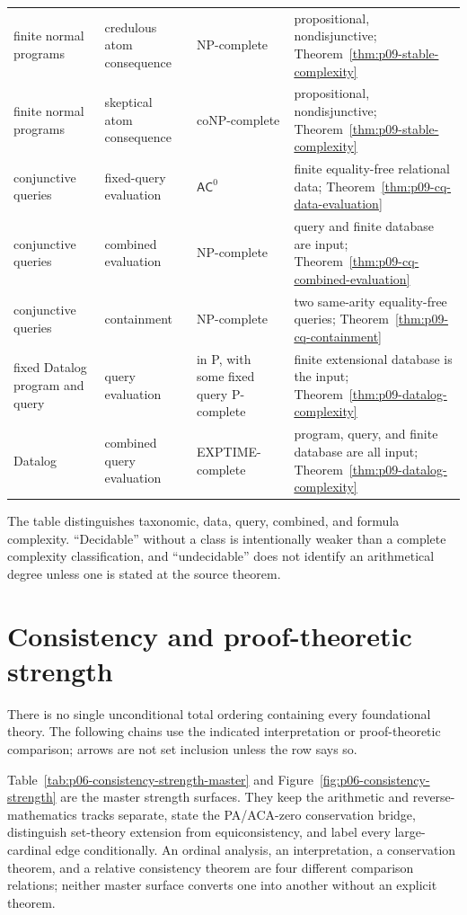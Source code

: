 \begin{longtable}{@{}p{}p{}p{}p{}@{}}
finite normal programs & credulous atom consequence & NP-complete &
propositional, nondisjunctive; Theorem~\ref{thm:p09-stable-complexity} \\
finite normal programs & skeptical atom consequence & coNP-complete &
propositional, nondisjunctive; Theorem~\ref{thm:p09-stable-complexity} \\
conjunctive queries & fixed-query evaluation & \(\mathsf{AC}^{0}\) & finite
equality-free relational data; Theorem~\ref{thm:p09-cq-data-evaluation} \\
conjunctive queries & combined evaluation & NP-complete & query and finite
database are input; Theorem~\ref{thm:p09-cq-combined-evaluation} \\
conjunctive queries & containment & NP-complete & two same-arity equality-free
queries; Theorem~\ref{thm:p09-cq-containment} \\
fixed Datalog program and query & query evaluation & in P, with some fixed
query P-complete & finite extensional database is the input;
Theorem~\ref{thm:p09-datalog-complexity} \\
Datalog & combined query evaluation & EXPTIME-complete & program, query, and
finite database are all input; Theorem~\ref{thm:p09-datalog-complexity} \\
\bottomrule
\end{longtable}

The table distinguishes taxonomic, data, query, combined, and formula
complexity. ``Decidable''
without a class is intentionally weaker than a complete complexity
classification, and ``undecidable'' does not identify an arithmetical degree
unless one is stated at the source theorem.

\section{Consistency and proof-theoretic strength}
\label{sec:p14-strength-table}

There is no single unconditional total ordering containing every foundational
theory. The following chains use the indicated interpretation or proof-theoretic
comparison; arrows are not set inclusion unless the row says so.

Table~\ref{tab:p06-consistency-strength-master} and
Figure~\ref{fig:p06-consistency-strength} are the master strength surfaces.
They keep the arithmetic and reverse-mathematics tracks separate, state the
PA/ACA-zero conservation bridge, distinguish set-theory extension from
equiconsistency, and label every large-cardinal edge conditionally.  An ordinal
analysis, an interpretation, a conservation theorem, and a relative
consistency theorem are four different comparison relations; neither master
surface converts one into another without an explicit theorem.


